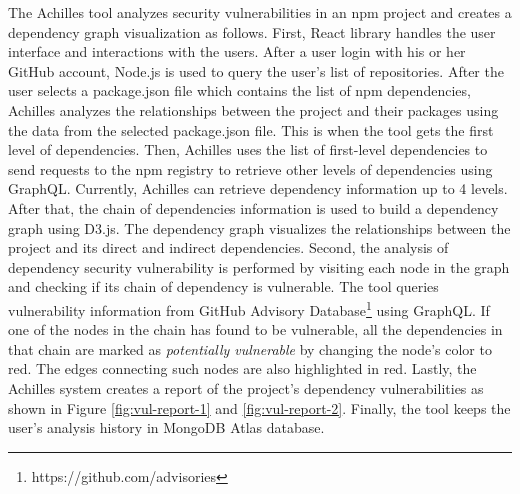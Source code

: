 \documentclass[conference]{IEEEtran}
\begin{document}
    The Achilles tool analyzes security vulnerabilities in an npm project and creates a dependency graph visualization as follows.
    First, React library handles the user interface and interactions with the users. After a user login with his or her GitHub account, Node.js is used to query the user's list of repositories. After the user selects a package.json file which contains the list of npm dependencies, Achilles analyzes the relationships between the project and their packages using the data from the selected package.json file. This is when the tool gets the first level of dependencies. Then, Achilles  uses the list of first-level dependencies to send requests to the npm registry to retrieve other levels of dependencies using GraphQL. Currently, Achilles can retrieve dependency information up to 4 levels.
    After that, the chain of dependencies information is used to build a dependency graph using D3.js. The dependency graph visualizes the relationships between the project and its direct and indirect dependencies.
    Second, the analysis of dependency security vulnerability is performed by visiting each node in the graph and checking if its chain of dependency is vulnerable. The tool queries vulnerability information from GitHub Advisory Database\footnote{https://github.com/advisories} using GraphQL. If one of the nodes in the chain has found to be vulnerable, all the dependencies in that chain are marked as \textit{potentially vulnerable} by changing the node's color to red. The edges connecting such nodes are also highlighted in red. 
    Lastly, the Achilles system creates a report of the project's dependency vulnerabilities as shown in Figure \ref{fig:vul-report-1} and \ref{fig:vul-report-2}.
    Finally, the tool keeps the user's analysis history in MongoDB Atlas database.
        

\end{document}
